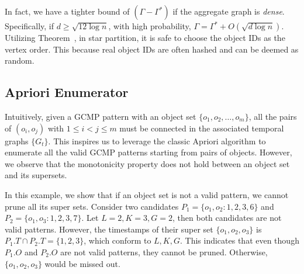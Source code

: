 In fact, we have a tighter bound of $(\Gamma - \Gamma^*)$ if 
the aggregate graph is \emph{dense}. Specifically, if $d\geq \sqrt{12\log n}$, with
high probability, $\Gamma = \Gamma^* + O(\sqrt{d\log n})$.
Utilizing Theorem~\label{THM:SPM_LB}, in star partition, it is safe 
to choose the object IDs as the vertex order. This because real object IDs are often 
hashed and can be deemed as random.


%
%

\subsection{Apriori Enumerator}
Intuitively, given a GCMP pattern with an object set $\{o_1,o_2,\ldots,o_m\}$, all the pairs of $(o_i,o_j)$ with $1\leq i<j\leq m$ must be connected in the associated temporal graphs $\{G_t\}$. This inspires us to leverage the classic Apriori algorithm to enumerate all the valid GCMP patterns starting from pairs of objects. However, we observe that the monotonicity property does not hold between an object set and its supersets.

\begin{example}
In this example, we show that if an object set is not a valid pattern, we cannot prune all its super sets.
Consider two candidates $P_1=\{o_1,o_2:1,2,3,6\}$ and $P_2=\{o_1,o_3:1,2,3,7\}$. 
Let $L=2,K=3,G=2$, then both candidates are not valid patterns. 
However, the timestamps of their super set $\{o_1,o_2,o_3\}$ is $P_1.T \cap P_2.T=\{1,2,3\}$, which
conform to $L,K,G$. This indicates that even though $P_1.O$ and $P_2.O$ are not valid patterns, they
cannot be pruned. Otherwise, $\{o_1,o_2,o_3\}$ would be missed out.
\end{example}   

